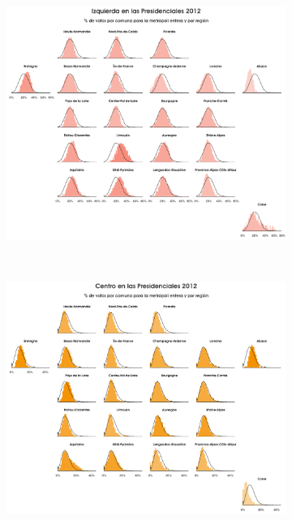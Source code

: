 \begin{figure}[h]
\begin{subfigure}{0.3\textwidth}
	\includegraphics[width = \textwidth]{Figs/AED/Geofacet_Distr_por_Reg_P12_Izquierda}
	\end{subfigure}
	~
	\begin{subfigure}{0.3\textwidth}
	\includegraphics[width = \textwidth]{Figs/AED/Geofacet_Distr_por_Reg_P12_Centro}
	\end{subfigure}
	~
	\begin{subfigure}{0.3\textwidth}

\end{subfigure}
\end{figure}
